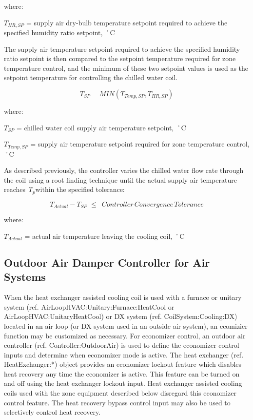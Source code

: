where:

\({T_{HR,SP}}\) = supply air dry-bulb temperature setpoint required to achieve the specified humidity ratio setpoint, ˚C

The supply air temperature setpoint required to achieve the specified humidity ratio setpoint is then compared to the setpoint temperature required for zone temperature control, and the minimum of these two setpoint values is used as the setpoint temperature for controlling the chilled water coil.

\begin{equation}
{T_{SP}} = MIN\left( {{T_{Temp,SP}},{T_{HR,SP}}} \right)
\end{equation}

where:

\({T_{SP}}\) = chilled water coil supply air temperature setpoint, ˚C

\({T_{Temp,SP}}\) = supply air temperature setpoint required for zone temperature control, ˚C

As described previously, the controller varies the chilled water flow rate through the coil using a root finding technique until the actual supply air temperature reaches \emph{T\(_{p}\)}within the specified tolerance:

\begin{equation}
{T_{Actual}} - {T_{SP}}\,\, \le \,\,\,Controller\,Convergence\,Tolerance
\end{equation}

where:

\({T_{Actual}}\) = actual air temperature leaving the cooling coil, ˚C

\subsection{Outdoor Air Damper Controller for Air Systems}\label{outdoor-air-damper-controller-for-air-systems}

When the heat exchanger assisted cooling coil is used with a furnace or unitary system (ref. AirLoopHVAC:Unitary:Furnace:HeatCool or AirLoopHVAC:UnitaryHeatCool) or DX system (ref. CoilSystem:Cooling:DX) located in an air loop (or DX system used in an outside air system), an ecomizier function may be customized as necessary. For economizer control, an outdoor air controller (ref. Controller:OutdoorAir) is used to define the economizer control inputs and determine when economizer mode is active. The heat exchanger (ref. HeatExchanger:*) object provides an economizer lockout feature which disables heat recovery any time the economizer is active. This feature can be turned on and off using the heat exchanger lockout input. Heat exchanger assisted cooling coils used with the zone equipment described below disregard this economizer control feature. The heat recovery bypass control input may also be used to selectively control heat recovery.

